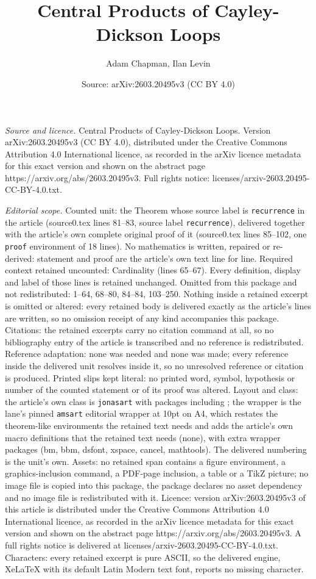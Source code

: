 \documentclass[10pt,a4paper]{amsart}
\title[Central Products of Cayley-Dickson Loops]{Central Products of Cayley-Dickson Loops}
\author{Adam Chapman, Ilan Levin}
\date{Source: arXiv:2603.20495v3 (CC BY 4.0)}
\begin{document}
\maketitle

\noindent\emph{Source and licence.} Central Products of Cayley-Dickson Loops. Version arXiv:2603.20495v3 (CC BY 4.0), distributed under the Creative Commons Attribution 4.0 International licence, as recorded in the arXiv licence metadata for this exact version and shown on the abstract page https://arxiv.org/abs/2603.20495v3. Full rights notice: licenses/arxiv-2603.20495-CC-BY-4.0.txt.\par\smallskip

\noindent\textit{Editorial scope.} Counted unit: the Theorem whose source label is \texttt{recurrence} in the article (source0.tex lines 81--83, source label \texttt{recurrence}), delivered together with the article's own complete original proof of it (source0.tex lines 85--102, one \texttt{proof} environment of 18 lines). No mathematics is written, repaired or re-derived: statement and proof are the article's own text line for line. Required context retained uncounted: Cardinality (lines 65--67). Every definition, display and label of those lines is retained unchanged. Omitted from this package and not redistributed: 1--64, 68--80, 84--84, 103--250. Nothing inside a retained excerpt is omitted or altered: every retained body is delivered exactly as the article's lines are written, so no omission receipt of any kind accompanies this package. Citations: the retained excerpts carry no citation command at all, so no bibliography entry of the article is transcribed and no reference is redistributed. Reference adaptation: none was needed and none was made; every reference inside the delivered unit resolves inside it, so no unresolved reference or citation is produced. Printed slips kept literal: no printed word, symbol, hypothesis or number of the counted statement or of its proof was altered. Layout and class: the article's own class is \texttt{jonasart} with packages including ; the wrapper is the lane's pinned \texttt{amsart} editorial wrapper at 10pt on A4, which restates the theorem-like environments the retained text needs and adds the article's own macro definitions that the retained text needs (none), with extra wrapper packages (bm, bbm, dsfont, xspace, cancel, mathtools). The delivered numbering is the unit's own. Assets: no retained span contains a figure environment, a graphics-inclusion command, a PDF-page inclusion, a table or a TikZ picture; no image file is copied into this package, the package declares no asset dependency and no image file is redistributed with it. Licence: version arXiv:2603.20495v3 of this article is distributed under the Creative Commons Attribution 4.0 International licence, as recorded in the arXiv licence metadata for this exact version and shown on the abstract page https://arxiv.org/abs/2603.20495v3. A full rights notice is delivered at licenses/arxiv-2603.20495-CC-BY-4.0.txt. Characters: every retained excerpt is pure ASCII, so the delivered engine, XeLaTeX with its default Latin Modern text font, reports no missing character.
\end{document}
